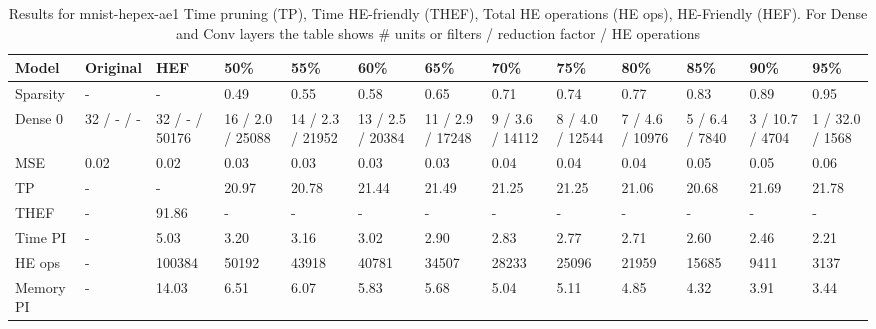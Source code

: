 \begin{table}
\centering
\caption{Results for mnist-hepex-ae1  Time pruning (TP), Time HE-friendly (THEF), Total HE operations (HE ops), HE-Friendly (HEF). For Dense and Conv layers the table shows # units or filters / reduction factor / HE operations}
\label{tab:mnist-hepex-ae1_results}
\begin{tabular}{lllllllllllll}
\toprule
Model &    Original &             HEF &               50\% &               55\% &               60\% &               65\% &              70\% &              75\% &              80\% &             85\% &              90\% &              95\% \\
\midrule
Sparsity  &           - &               - &              0.49 &              0.55 &              0.58 &              0.65 &             0.71 &             0.74 &             0.77 &            0.83 &             0.89 &             0.95 \\
Dense 0   &  32 / - / - &  32 / - / 50176 &  16 / 2.0 / 25088 &  14 / 2.3 / 21952 &  13 / 2.5 / 20384 &  11 / 2.9 / 17248 &  9 / 3.6 / 14112 &  8 / 4.0 / 12544 &  7 / 4.6 / 10976 &  5 / 6.4 / 7840 &  3 / 10.7 / 4704 &  1 / 32.0 / 1568 \\
MSE       &        0.02 &            0.02 &              0.03 &              0.03 &              0.03 &              0.03 &             0.04 &             0.04 &             0.04 &            0.05 &             0.05 &             0.06 \\
TP        &           - &               - &             20.97 &             20.78 &             21.44 &             21.49 &            21.25 &            21.25 &            21.06 &           20.68 &            21.69 &            21.78 \\
THEF      &           - &           91.86 &                 - &                 - &                 - &                 - &                - &                - &                - &               - &                - &                - \\
Time PI   &           - &            5.03 &              3.20 &              3.16 &              3.02 &              2.90 &             2.83 &             2.77 &             2.71 &            2.60 &             2.46 &             2.21 \\
HE ops    &           - &          100384 &             50192 &             43918 &             40781 &             34507 &            28233 &            25096 &            21959 &           15685 &             9411 &             3137 \\
Memory PI &           - &           14.03 &              6.51 &              6.07 &              5.83 &              5.68 &             5.04 &             5.11 &             4.85 &            4.32 &             3.91 &             3.44 \\
\bottomrule
\end{tabular}
\end{table}
